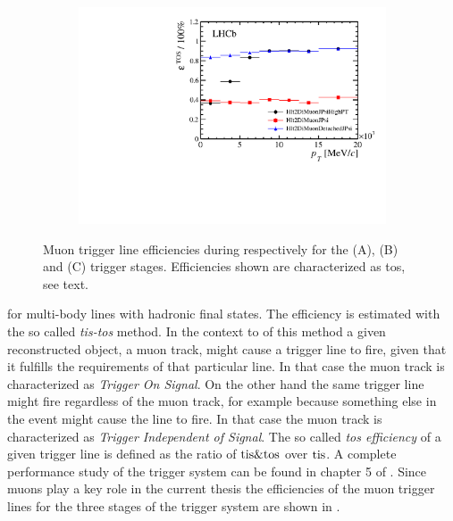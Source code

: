 \begin{figure}[t!]
\begin{subfigure}{0.5\textwidth}
    \includegraphics[width=\textwidth,trim=0.45cm 0cm 0.4cm 0cm, clip=true]{Figures/Chapter2/hlt2_muon_eff}
    \caption{}
    \label{det_run_one_hlt2_muon_line_eff}
  \end{subfigure}
  \caption{Muon trigger line efficiencies during \runone respectively for the \lzero (A), \hltone (B) and \hlttwo (C) trigger stages.
           Efficiencies shown are characterized as tos, see text.}
  \label{det_run_one_muon_line_eff}
\end{figure}

\noindent for multi-body lines with hadronic final states. The efficiency is estimated with the so called {\it tis-tos} 
method. In the context to of this method a given reconstructed object, \ie a muon track, might cause a 
trigger line to fire, given that it fulfills the requirements of that particular line. In that case the 
muon track is characterized as {\it Trigger On Signal}. On the other hand the same trigger line might 
fire regardless of the muon track, for example because something else in the event might cause the line 
to fire. In that case the muon track is characterized as {\it Trigger Independent of Signal}. 
The so called {\it tos efficiency} of a given trigger line is defined as the ratio of ${\rm tis}\&{\rm tos}$ 
over ${\rm tis}$. A complete performance study of the trigger system can be found in chapter 5 
of \cite{Aaij:2014jba}. Since muons play a key role in the current thesis the efficiencies of the muon 
trigger lines for the three stages of the \lhcb trigger system are  shown in .


